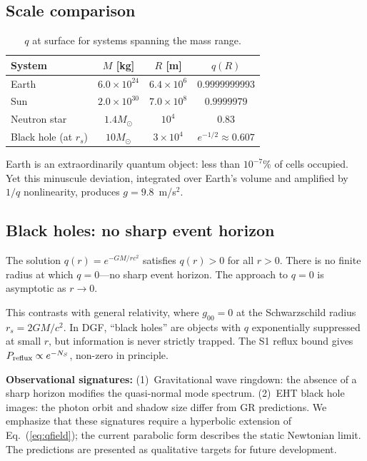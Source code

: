 \documentclass[reprint]{revtex4-2}
\begin{document}
\subsection{Scale comparison}

\begin{table}[h]
\caption{$q$ at surface for systems spanning the mass range.}
\label{tab:scales}
\begin{tabular}{lccc}
\toprule
System & $M$ [kg] & $R$ [m] & $q(R)$ \\
\midrule
Earth & $6.0\times 10^{24}$ & $6.4\times 10^6$ & $0.9999999993$ \\
Sun & $2.0\times 10^{30}$ & $7.0\times 10^8$ & $0.9999979$ \\
Neutron star & $1.4M_\odot$ & $10^4$ & $0.83$ \\
Black hole (at $r_s$) & $10M_\odot$ & $3\times 10^4$ & $e^{-1/2}\approx 0.607$ \\
\bottomrule
\end{tabular}
\end{table}

Earth is an extraordinarily quantum object: less than $10^{-7}$\% of cells occupied. Yet this minuscule deviation, integrated over Earth's volume and amplified by $1/q$ nonlinearity, produces $g=9.8$~m/s$^2$.

\subsection{Black holes: no sharp event horizon}

The solution $q(r)=e^{-GM/rc^2}$ satisfies $q(r)>0$ for all $r>0$. There is no finite radius at which $q=0$---no sharp event horizon. The approach to $q=0$ is asymptotic as $r\to 0$.

This contrasts with general relativity, where $g_{00}=0$ at the Schwarzschild radius $r_s=2GM/c^2$. In DGF, ``black holes'' are objects with $q$ exponentially suppressed at small $r$, but information is never strictly trapped. The S1 reflux bound gives $P_{\rm reflux}\propto e^{-N_S}$, non-zero in principle.

\textbf{Observational signatures:} (1)~Gravitational wave ringdown: the absence of a sharp horizon modifies the quasi-normal mode spectrum. (2)~EHT black hole images: the photon orbit and shadow size differ from GR predictions. We emphasize that these signatures require a hyperbolic extension of Eq.~(\ref{eq:qfield}); the current parabolic form describes the static Newtonian limit. The predictions are presented as qualitative targets for future development.
\end{document}
